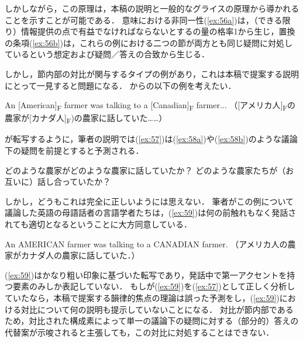 \documentclass{goken}
\newcommand{\ori}[1]{\noindent\textcolor[gray]{0.7}{\fontsize{8pt}{8pt}\selectfont{\textsf{(p.~#1)}}} }
\begin{document}
\noindent
しかしながら，この原理は，本稿の説明と一般的なグライスの原理から導かれることを示すことが可能である．
意味における非同一性(\ref{ex:56a})は，（できる限り）情報提供の点で有益でなければならないとする\citeauthor{Grice1989}の量の格率1から生じ，置換の条項(\ref{ex:56b})は，これらの例における二つの節が両方とも同じ疑問に対処しているという想定および疑問／答えの合致から生じる．

しかし，節内部の対比が関与するタイプの例があり，これは本稿で提案する説明にとって一見すると問題になる．
\citealt{Rooth1992a}からの以下の例を考えたい．

\begin{exe}
	\ex\label{ex:57} An [American]\textsubscript{F} farmer was talking to a [Canadian]\textsubscript{F} farmer... （[アメリカ人]\textsubscript{F}の農家が[カナダ人]\textsubscript{F})の農家に話していた……）
\end{exe}

\noindent
\citeauthor{Rooth1992a}が転写するように，筆者の説明では(\ref{ex:57})は(\ref{ex:58a})や(\ref{ex:58b})のような議論下の疑問を前提とすると予測される．

\begin{exe}
	\ex\label{ex:58}
  \begin{xlist}
    \ex\label{ex:58a}
    どのような農家がどのような農家に話していたか？
    \ex\label{ex:58b}
    どのような農家たちが（お互いに）話し合っていたか？
  \end{xlist}
\end{exe}

\ori{54}
\noindent
しかし，どうもこれは完全に正しいようには思えない．
筆者がこの例について議論した英語の母語話者の言語学者たちは，(\ref{ex:59})は何の前触れもなく発話されても適切となるということに大方同意している．

\begin{exe}
	\ex\label{ex:59} An AMERICAN farmer was talking to a CANADIAN farmer. （アメリカ人の農家がカナダ人の農家に話していた．）
\end{exe}

\noindent
(\ref{ex:59})はかなり粗い印象に基づいた転写であり，発話中で第一アクセントを持つ要素のみしか表記していない．
もし\citeauthor{Rooth1992a}が(\ref{ex:59})を(\ref{ex:57})として正しく分析していたなら，本稿で提案する韻律的焦点の理論は誤った予測をし，(\ref{ex:59})における対比について何の説明も提示していないことになる．
対比が節内部であるため，対比された構成素によって単一の議論下の疑問に対する（部分的）答えの代替案が示唆されると主張しても，この対比に対処することはできない．
\end{document}
